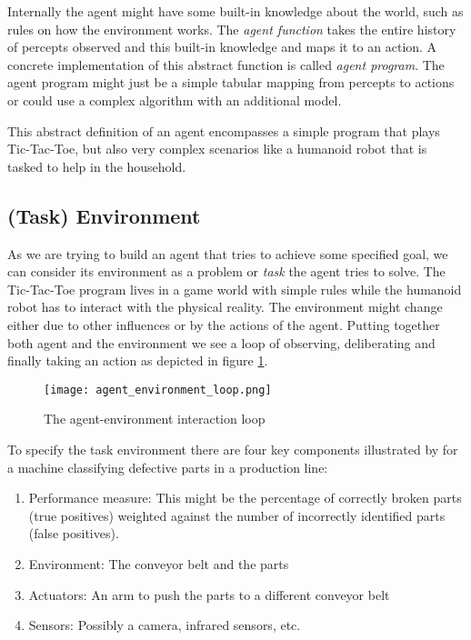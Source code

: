 Internally the agent might have some built-in knowledge about the world, such as rules on how the environment works. The \textit{agent function} takes the entire history of percepts observed and this built-in knowledge and maps it to an action. A concrete implementation of this abstract function is called \textit{agent program}. The agent program might just be a simple tabular mapping from percepts to actions or could use a complex algorithm with an additional model.

This abstract definition of an agent encompasses a simple program that plays Tic-Tac-Toe, but also very complex scenarios like a humanoid robot that is tasked to help in the household.

\subsection{(Task) Environment}
\label{environment}

As we are trying to build an agent that tries to achieve some specified goal, we can consider its environment as a problem or \textit{task} the agent tries to solve. The Tic-Tac-Toe program lives in a game world with simple rules while the humanoid robot has to interact with the physical reality. The environment might change either due to other influences or by the actions of the agent. Putting together both agent and the environment we see a loop of observing, deliberating and finally taking an action as depicted in figure \ref{agent_environment_loop}.

\begin{figure}
    \centering
    \texttt{[image: agent\_environment\_loop.png]}
    \caption{The agent-environment interaction loop \cite[cf. p. 96]{russell_artificial_2021}}
    \label{agent_environment_loop}
\end{figure}

To specify the task environment there are four key components illustrated by for a machine classifying defective parts in a production line:

\begin{enumerate}
    \item Performance measure: This might be the percentage of correctly broken parts (true positives) weighted against the number of incorrectly identified parts (false positives).
    \item Environment: The conveyor belt and the parts
    \item Actuators: An arm to push the parts to a different conveyor belt
    \item Sensors: Possibly a camera, infrared sensors, etc.
\end{enumerate}

